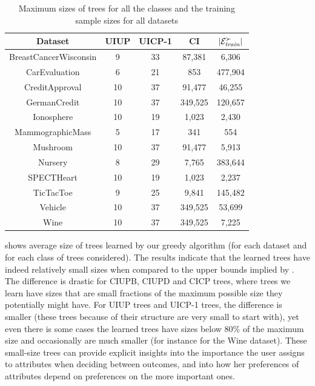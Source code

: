 \begin{table}
  \centering
  \small
	\setlength\tabcolsep{6pt}
  \begin{tabular}{ |c||c|c|c|c| }
    \hline
    Dataset           & UIUP & UICP-1 & CI      & $|\mathcal{E}^\succ_{\textit{train}}|$ \\
    \hline \hline                                 
    BreastCancerWisconsin               & 9    & 33     & 87,381   & 6,306   \\ \hline
    CarEvaluation                & 6    & 21     & 853      & 477,904 \\ \hline
    CreditApproval                & 10   & 37     & 91,477   & 46,255  \\ \hline
    GermanCredit                & 10   & 37     & 349,525  & 120,657 \\ \hline
    Ionosphere                & 10   & 19     & 1,023    & 2,430   \\ \hline
    MammographicMass                & 5    & 17     & 341      & 554     \\ \hline
    Mushroom                & 10   & 37     & 91,477   & 5,913   \\ \hline
    Nursery                & 8    & 29     & 7,765    & 383,644 \\ \hline
    SPECTHeart                & 10   & 19     & 1,023    & 2,237   \\ \hline
    TicTacToe               & 9    & 25     & 9,841    & 145,482 \\ \hline
    Vehicle                & 10   & 37     & 349,525  & 53,699  \\ \hline
    Wine                & 10   & 37     & 349,525  & 7,225   \\ \hline
  \end{tabular}
  \caption{Maximum sizes of trees for all the classes and the 
					 training sample sizes for all datasets}
  \label{tbl:trees_max_size}
\end{table}

 shows average size of trees learned by our greedy 
algorithm (for each dataset and for each class of trees considered). The
results indicate that the learned trees have indeed relatively small sizes
when compared to the upper bounds implied by . The 
difference is drastic for CIUPB, CIUPD and CICP trees, where trees we learn
have sizes that are small fractions of the maximum possible size they 
potentially might have. For UIUP trees and UICP-1 trees, the difference is 
smaller (these trees because of their structure are very small to start with),
yet even there is some cases the learned trees have sizes below 80\% of the
maximum size and occasionally are much smaller (for instance for the Wine 
dataset). These small-size trees can provide explicit insights into the 
importance the user assigns to attributes when deciding between outcomes, and 
into how her preferences of attributes depend on preferences on the more 
important ones. 

